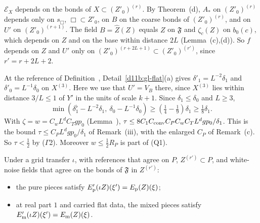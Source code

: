 \begin{step}[Part (b)]
$\mathcal E_X$ depends on the bonds of $X\subset(Z'_0)^{(r)}$. By Theorem~(d), $A_*$ on $(Z'_0)^{(r)}$ depends only on $s_\Box$, $\Box\subset Z'_0$, on $B$ on the coarse bonds of $(Z'_0)^{(r)}$, and on $U'$ on $(Z'_0)^{(r+1)}$. The field $B=\hat Z(Z)$ equals $Z$ on $\mathfrak F$ and $\zeta_c(Z)$ on $b_0(c)$, which depends on $Z$ and on the base within distance $2L$ (Lemma~(c),(d)). So $f$ depends on $Z$ and $U'$ only on $(Z'_0)^{(r+2L+1)}\subset(Z'_0)^{(r')}$, since $r'=r+2L+2$.
\end{step}

\begin{step}
At the reference of Definition~, Detail~\ref{d11b:gl-flat}(a) gives $\delta'_1=L^{-2}\delta_1$ and $\delta'_0=L^{-1}\delta_0$ on $X^{(3)}$. Here we use that $U'=V_B$ there, since $X^{(3)}$ lies within distance $3/L\le1$ of $Y'$ in the units of scale $k+1$. Since $\delta_1\le\delta_0$ and $L\ge3$,
\[
\min(\delta_1^\flat-L^{-2}\delta_1,\ \delta_0-L^{-1}\delta_0)\ge(\tfrac14-\tfrac19)\delta_1\ge\tfrac18\delta_1 .
\]
With $\zeta=w=C_wL^dC_Tgp_0$ (Lemma~), $\tau\le8C_1C_{\rm conv}C_PC_wC_TL^dgp_0/\delta_1$. This is the bound $\tau\le C_PL^dgp_0/\delta_1$ of Remark~(iii), with the enlarged $C_P$ of Remark~(c). So $\tau<\frac12$ by ($\Gamma$2). Moreover $w\le\frac12R_P$ is part of (Q1).
\end{step}

\begin{detail}\label{d11b:gl-pieces}
Under a grid transfer $\iota$, with references that agree on $P$, $Z^{(r')}\subset P$, and white-noise fields that agree on the bonds of $\mathfrak F$ in $Z^{(r')}$:
\begin{itemize}
\item[(a)] the pure pieces satisfy $E'_{\rm p}(\iota Z)(\xi')=E_{\rm p}(Z)(\xi)$;
\item[(b)] at real part $1$ and carried flat data, the mixed pieces satisfy $E'_{\rm m}(\iota Z)(\xi')=E_{\rm m}(Z)(\xi)$.
\end{itemize}
\end{detail}

